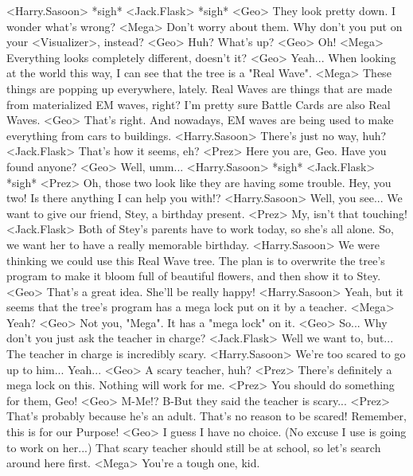 <Harry.Sasoon> *sigh* 
<Jack.Flask> *sigh* 
<Geo> They look pretty down. I wonder what's wrong? 
<Mega> Don't worry about them. 
Why don't you put on your <Visualizer>, instead? 
<Geo> Huh? What's up? 
<Geo> Oh! 
<Mega> Everything looks completely different, doesn't it? 
<Geo> Yeah... When looking at the world 
this way, I can see that the tree is a "Real Wave". 
<Mega> These things are popping up everywhere, lately. 
Real Waves are things that are made from materialized EM waves, right? 
I'm pretty sure Battle Cards are also Real Waves. 
<Geo> That's right. And nowadays, EM waves are being used 
to make everything from cars to buildings. 
<Harry.Sasoon> There's just no way, huh? 
<Jack.Flask> That's how it seems, eh? 
<Prez> Here you are, Geo. Have you found anyone? 
<Geo> Well, umm... 
<Harry.Sasoon> *sigh* 
<Jack.Flask> *sigh* 
<Prez> Oh, those two look like they are having some trouble. 
Hey, you two! Is there anything I can help you with!? 
<Harry.Sasoon> Well, you see... 
We want to give our friend, Stey, a birthday present. 
<Prez> My, isn't that touching! 
<Jack.Flask> Both of Stey's parents have to work today, so she's all alone. 
So, we want her to have a really memorable birthday. 
<Harry.Sasoon> We were thinking we could use this Real Wave tree. 
The plan is to overwrite the tree's program to make it bloom full of 
beautiful flowers, and then show it to Stey. 
<Geo> That's a great idea. She'll be really happy! 
<Harry.Sasoon> Yeah, but it seems that the tree's program has a 
mega lock put on it by a teacher. 
<Mega> Yeah? 
<Geo> Not you, "Mega". It has a "mega lock" on it. 
<Geo> So... Why don't you just ask the teacher in charge? 
<Jack.Flask> Well we want to, but... 
The teacher in charge is incredibly scary. 
<Harry.Sasoon> We're too scared to go up to him... Yeah... 
<Geo> A scary teacher, huh? 
<Prez> There's definitely a mega lock on this. Nothing will work for me. 
<Prez> You should do something for them, Geo! 
<Geo> M-Me!? B-But they said the teacher is scary... 
<Prez> That's probably because he's an adult. That's no reason to be scared! 
Remember, this is for our Purpose! 
<Geo> I guess I have no choice. (No excuse I use is going  to work on her...) 
That scary teacher should still be at school, so let's search around here first. 
<Mega> You're a tough one, kid. 
